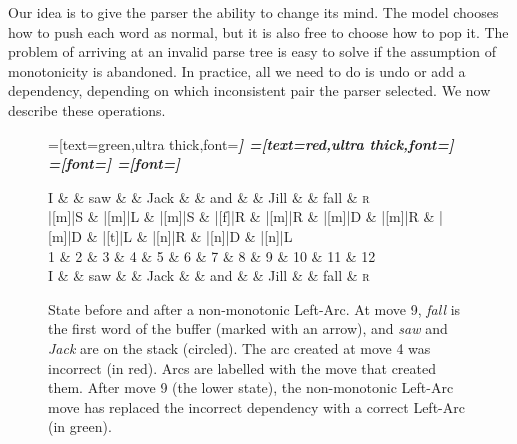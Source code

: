 \documentclass[11pt,letterpaper]{article}
\begin{document}
Our idea is to give the parser the ability to change its mind. The model chooses
how to push each word as normal, but it is also free to choose how to pop it.
The problem of arriving at an invalid parse tree is easy to solve if
the assumption of monotonicity is abandoned.
In practice, all we need to do is 
undo or add a dependency, depending on which inconsistent pair the parser selected.
We now describe these operations.

\begin{figure}
    \centering
    \begin{dependency}[theme=simple]
        =[text=green,ultra thick,font=\bfseries\itshape]
        =[text=red,ultra thick,font=\bfseries\itshape]
        =[font=\bfseries\itshape]
        =[font=\itshape]

        \begin{deptext}[column sep=.075cm, row sep=.1ex]
            I \&           \& saw \&          \& Jack       \& \& and     \&           \& Jill   \&  \& fall \& \textsc{r} \\
|[m]|S \& |[m]|L \& |[m]|S   \& |[f]|R \& |[m]|R \& |[m]|D \& |[m]|R \& |[m]|D \& |[t]|L \& |[n]|R \& |[n]|D \& |[n]|L \\
            1 \&     2       \& 3  \&   4      \& 5          \& 6 \& 7     \& 8 \& 9 \& 10 \& 11 \& 12 \\
    I \&           \& saw \&          \& Jack       \& \& and     \&           \& Jill   \&      \& fall \& \textsc{r} \\
        \end{deptext}
    
    
\end{dependency}
\caption{
    State before and after a non-monotonic Left-Arc.
    At move 9, \emph{fall} is the first word of the buffer (marked with an arrow),
    and \emph{saw} and \emph{Jack} are on the stack (circled). The arc created at move 4 was
    incorrect (in red). Arcs are labelled with the move that created them.
    After move 9 (the lower state), the non-monotonic Left-Arc move
    has replaced the incorrect dependency with a correct Left-Arc (in green).
\label{fig:clobber}}
\end{figure}
\end{document}
